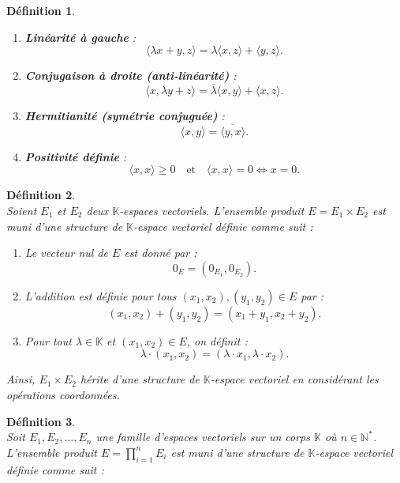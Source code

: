 \documentclass[a4paper, 14pt]{report}
\newtheorem{definition}{Définition}[section]
\begin{document}
\begin{onehalfspace}
{\begin{definition}
				\begin{enumerate} [label=\roman*)]
					\item \textbf{Linéarité à gauche} :
					\[
					\langle \lambda x + y, z \rangle = \lambda \langle x, z \rangle + \langle y, z \rangle.
					\]
					
					\item \textbf{Conjugaison à droite (anti-linéarité)} :
					\[
					\langle x, \lambda y + z \rangle = \overline{\lambda} \langle x, y \rangle + \langle x, z \rangle.
					\]
					
					\item \textbf{Hermitianité (symétrie conjuguée)} :
					\[
					\langle x, y \rangle = \overline{\langle y, x \rangle}.
					\]
					
					\item \textbf{Positivité définie} :
					\[
					\langle x, x \rangle \geq 0 \quad \text{et} \quad \langle x, x \rangle = 0 \iff x = 0.
					\]
				\end{enumerate}
			\end{definition}
			
			\begin{definition} \cite{axler2024linear}\\
				Soient \( E_1 \) et \( E_2 \) deux \(\mathbb{K}\)-espaces vectoriels.  L'ensemble produit \( E = E_1 \times E_2 \) est muni d'une structure de \(\mathbb{K}\)-espace vectoriel définie comme suit :  
				\begin{enumerate}[label=\roman*)]
					\item   
					Le vecteur nul de \( E \) est donné par :  
					\[
					0_E = (0_{E_1}, 0_{E_2}).
					\]
					
					\item 
					L'addition est définie pour tous \( (x_1, x_2), (y_1, y_2) \in E \) par :  
					\[
					(x_1, x_2) + (y_1, y_2) = (x_1 + y_1, x_2 + y_2).
					\]
					
					\item   
					Pour tout \( \lambda \in \mathbb{K} \) et \( (x_1, x_2) \in E \), on définit :  
					\[
					\lambda \cdot (x_1, x_2) = (\lambda \cdot x_1, \lambda \cdot x_2).
					\]
				\end{enumerate}
				Ainsi, \( E_1 \times E_2 \) hérite d'une structure de \( \mathbb{K} \)-espace vectoriel en considérant les opérations coordonnées.
			\end{definition}
			
			\begin{definition} \cite{axler2024linear}\\
				Soit \( E_1, E_2, \dots, E_n \) une famille d'espaces vectoriels sur un corps \( \mathbb{K} \) où \( n \in \mathbb{N}^{*} \). L'ensemble produit \( E = \prod_{i=1}^{n} E_i \) est muni d'une structure de \( \mathbb{K} \)-espace vectoriel définie comme suit :
				

\end{definition}}
\end{onehalfspace}
\end{document}
